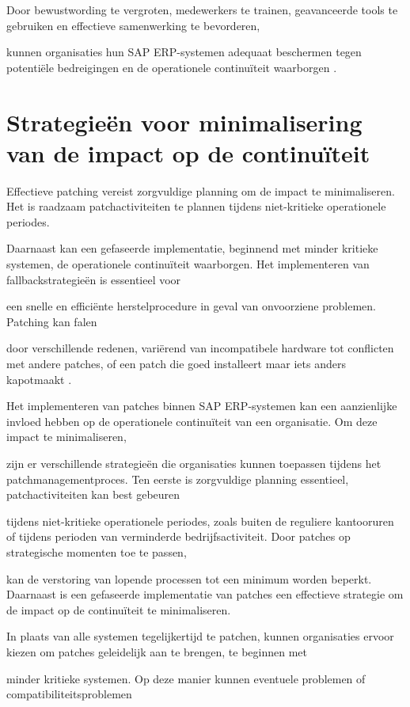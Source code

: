 Door bewustwording te vergroten, medewerkers te trainen, geavanceerde tools te gebruiken en effectieve samenwerking te bevorderen, 

kunnen organisaties hun SAP ERP-systemen adequaat beschermen tegen potentiële bedreigingen en de operationele continuïteit waarborgen \autocite{Graffeo2018}.

\section{Strategieën voor minimalisering van de impact op de continuïteit}
Effectieve patching vereist zorgvuldige planning om de impact te minimaliseren. Het is raadzaam patchactiviteiten te plannen tijdens niet-kritieke operationele periodes.

Daarnaast kan een gefaseerde implementatie, beginnend met minder kritieke systemen, de operationele continuïteit waarborgen. Het implementeren van fallbackstrategieën is essentieel voor 

een snelle en efficiënte herstelprocedure in geval van onvoorziene problemen. Patching kan falen

door verschillende redenen, variërend van incompatibele hardware tot conflicten met andere patches, of een patch die goed installeert maar iets anders kapotmaakt \autocite{Shein2022}.

Het implementeren van patches binnen SAP ERP-systemen kan een aanzienlijke invloed hebben op de operationele continuïteit van een organisatie. Om deze impact te minimaliseren,

zijn er verschillende strategieën die organisaties kunnen toepassen tijdens het patchmanagementproces. Ten eerste is zorgvuldige planning essentieel, patchactiviteiten kan best gebeuren

tijdens niet-kritieke operationele periodes, zoals buiten de reguliere kantooruren of tijdens perioden van verminderde bedrijfsactiviteit. Door patches op strategische momenten toe te passen,

kan de verstoring van lopende processen tot een minimum worden beperkt. Daarnaast is een gefaseerde implementatie van patches een effectieve strategie om de impact op de continuïteit te minimaliseren. 

In plaats van alle systemen tegelijkertijd te patchen, kunnen organisaties ervoor kiezen om patches geleidelijk aan te brengen, te beginnen met

minder kritieke systemen. Op deze manier kunnen eventuele problemen of compatibiliteitsproblemen


